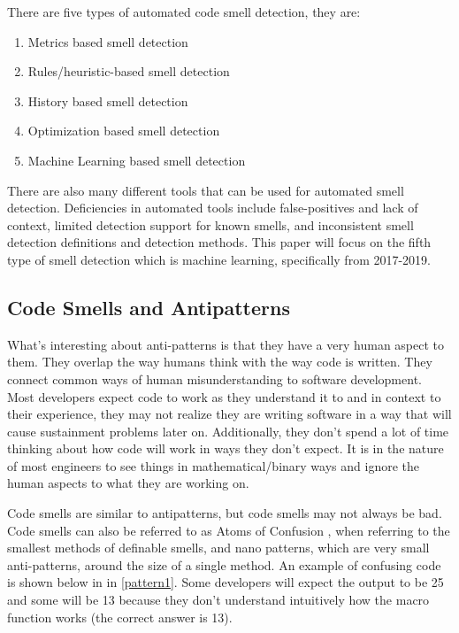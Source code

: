 \documentclass[conference]{IEEEtran}
\begin{document}
There are five types of automated code smell detection\cite{lafi_code_2019}, they are:
\begin{enumerate}
\item Metrics based smell detection
\item Rules/heuristic-based smell detection
\item History based smell detection
\item Optimization based smell detection
\item Machine Learning based smell detection
\end{enumerate}
There are also many different tools\cite{walter_code_2018} that can be used for automated smell detection.
Deficiencies in automated tools include false-positives and lack of context, limited detection support for known smells, and inconsistent smell detection definitions and detection methods\cite{sharma_detecting_2018}.
This paper will focus on the fifth type of smell detection which is machine learning, specifically from 2017-2019.

\subsection{Code Smells and Antipatterns}
What's interesting about anti-patterns is that they have a very human aspect to them. 
They overlap the way humans think with the way code is written. 
They connect common ways of human misunderstanding to software development. 
Most developers expect code to work as they understand it to and in context to their experience, they may not realize they are writing software in a way that will cause sustainment problems later on. 
Additionally, they don't spend a lot of time thinking about how code will work in ways they don't expect.
It is in the nature of most engineers to see things in mathematical/binary ways and ignore the human aspects to what they are working on.

Code smells are similar to antipatterns, but code smells may not always be bad.
Code smells can also be referred to as Atoms of Confusion \cite{gopstein_understanding_2017}, when referring to the smallest methods of definable smells, and nano patterns, which are very small anti-patterns, around the size of a single method. 
An example of confusing code is shown below in in \ref{pattern1}.
Some developers will expect the output to be 25 and some will be 13 because they don't understand intuitively how the macro function works (the correct answer is 13).
\end{document}
